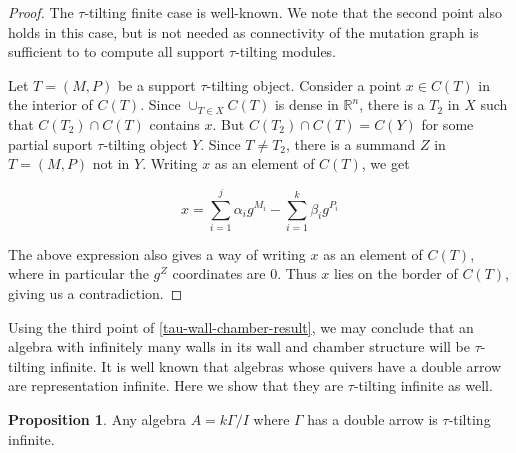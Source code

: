 \documentclass[]{article}
\theoremstyle{definition}
\newtheorem{proposition}{Proposition}[section]
\newcommand{\tu}{\ensuremath{\tau}}
\begin{document}
\begin{proof}
	The \tu-tilting finite case is well-known. We note that the second point also holds in this case, but is not needed as connectivity of the mutation graph is sufficient to to compute all support \tu-tilting modules.
	
	Let $T = (M,P)$ be a support \tu-tilting object. Consider a point $x \in C(T)$ in the interior of $C(T)$. Since $\cup_{T \in X} C(T)$ is dense in $\mathbb{R}^n$, there is a $T_2$ in $X$ such that $C(T_2) \cap C(T)$ contains $x$. But $C(T_2)\cap C(T) = C(Y)$ for some partial suport \tu-tilting object $Y$. Since $T \neq T_2$, there is a summand $Z$ in $T = (M,P)$ not in $Y$. Writing $x$ as an element of $C(T)$, we get
	
	\[x = \sum_{i = 1}^{j} \alpha_ig^{M_i} - \sum_{i = 1}^{k}\beta_ig^{P_i}\]

	The above expression also gives a way of writing $x$ as an element of  $C(T)$, where in particular the $g^{Z}$ coordinates are $0$. Thus $x$ lies on the border of $C(T)$, giving us a contradiction.
	
\end{proof}

Using the third point of \cref{tau-wall-chamber-result}, we may conclude that an algebra with infinitely many walls in its wall and chamber structure will be \tu-tilting infinite. It is well known that algebras whose quivers have a double arrow are representation infinite. Here we show that they are \tu-tilting infinite as well.
\begin{proposition}
	Any algebra $A = k\Gamma/I$ where $\Gamma$ has a double arrow is \tu-tilting infinite.
\end{proposition}
\end{document}

